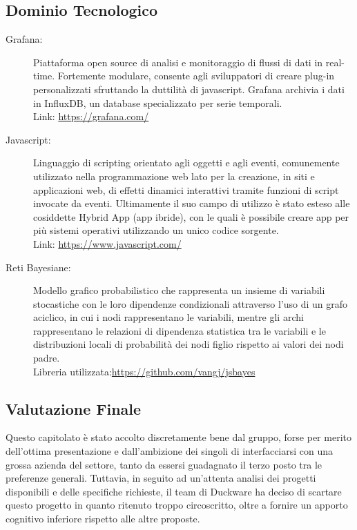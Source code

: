 \subsection{Dominio Tecnologico}
\begin{description}	
	\item[Grafana:] Piattaforma open source di analisi e monitoraggio di flussi di dati in real-time. Fortemente modulare, consente agli sviluppatori di creare plug-in personalizzati sfruttando la duttilità di javascript.
Grafana archivia i dati in InfluxDB, un database specializzato per serie temporali.\\
Link: \href{https://grafana.com/}{https://grafana.com/}
	
	\item[Javascript:] Linguaggio di scripting orientato agli oggetti e agli eventi, comunemente utilizzato nella programmazione web lato  per la creazione, in siti e applicazioni web, di effetti dinamici interattivi tramite funzioni di script invocate da eventi.
Ultimamente il suo campo di utilizzo è stato esteso alle cosiddette Hybrid App (app ibride), con le quali è possibile creare app per più sistemi operativi utilizzando un unico codice sorgente.\\
Link: \href{https://www.javascript.com/}{https://www.javascript.com/}
	
	\item[Reti Bayesiane:] Modello grafico probabilistico che rappresenta un insieme di variabili stocastiche con le loro dipendenze condizionali attraverso l'uso di un grafo aciclico, in cui i nodi rappresentano le variabili, mentre gli archi rappresentano le relazioni di dipendenza statistica tra le variabili e le distribuzioni locali di probabilità dei nodi figlio rispetto ai valori dei nodi padre.\\
Libreria utilizzata:\href{https://github.com/vangj/jsbayes}{https://github.com/vangj/jsbayes} 
\end{description}

\subsection{Valutazione Finale}
Questo capitolato è stato accolto discretamente bene dal gruppo, forse per merito dell'ottima presentazione e dall'ambizione dei singoli di interfacciarsi con una grossa azienda del settore, tanto da essersi guadagnato il terzo posto tra le preferenze	generali.
Tuttavia, in seguito ad un'attenta analisi dei progetti disponibili e delle specifiche richieste, il team di Duckware ha deciso di scartare questo progetto in quanto ritenuto troppo circoscritto, oltre a fornire un apporto cognitivo inferiore rispetto alle altre proposte.
